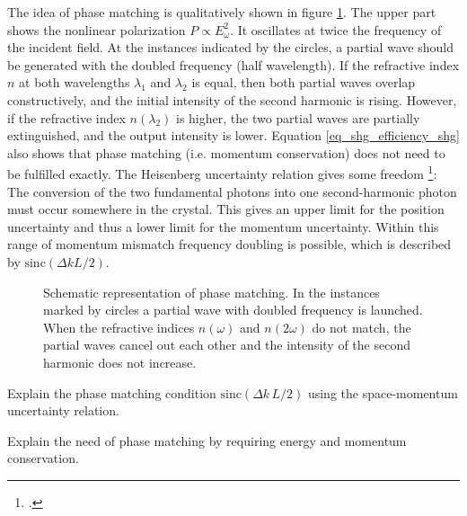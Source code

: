 The idea of phase matching is qualitatively shown in figure
\ref{fig:shg_phase_matching}. The upper part shows the nonlinear 
polarization $P \propto E_{\omega}^2$. It oscillates
at twice the frequency of the incident field. At the instances indicated by the circles,  a partial wave should  be generated with
the doubled frequency (half wavelength). If the
refractive index $n$ at both wavelengths $\lambda_1$ and
$\lambda_2$ is equal, then both partial waves overlap
constructively, and the initial intensity of the second harmonic
is rising. However, if the refractive index $n(\lambda_2)$ is higher,
the two partial waves are partially extinguished, and the
output intensity is lower. Equation
\ref{eq_shg_efficiency_shg} also shows that 
phase matching (i.e. momentum conservation) does not need to be fulfilled  exactly.  The Heisenberg uncertainty relation gives some freedom
\footcite{Demtroeder_laser,SalehTeich1991}:
The conversion of the two fundamental photons into one second-harmonic photon 
must occur somewhere in the crystal. This gives an upper limit for  the position uncertainty and thus a lower limit for the momentum uncertainty.
Within  this  range of momentum mismatch frequency doubling  is possible, which is described by $\text{sinc}(\Delta k L/2)$.




\begin{figure}
\center

\caption{Schematic representation of 
phase matching.
In the instances marked by circles a
partial wave with doubled frequency is launched. When the
refractive indices $n(\omega)$ and $n(2 \omega)$ do not
match, the partial waves cancel out each other  and
the intensity of the second harmonic does not increase.}
\label{fig:shg_phase_matching}
\end{figure}


\begin{questions}

\item Explain the phase matching condition $\text{sinc} ( \Delta k \, L /2 )$ using the space-momentum uncertainty relation.

\item Explain the need of phase matching by requiring energy and momentum conservation.

\end{questions}


